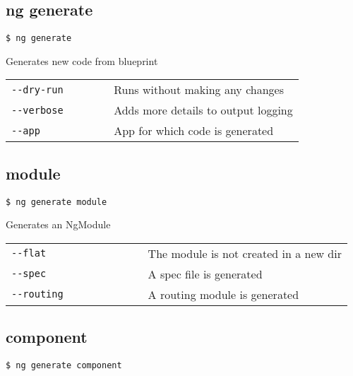 \documentclass[8pt]{extarticle} %
\begin{document}
\begin{multicols*}{3}

\section*{ng generate}

  \vspace{1ex}
  {\tt \$ ng generate  \itt{[options...]}}

  \vspace{0.6ex}

  {\small Generates new code from blueprint}

  \begin{tabular}{L{0.35\linewidth} L{0.65\linewidth}}
    \tt -{}-dry-run & \small Runs without making any changes \\
    \tt -{}-verbose & \small Adds more details to output logging \\
    \tt -{}-app & \small App for which code is generated
  \end{tabular}

  \subsection*{module}

    \vspace{1ex}
    {\tt \$ ng generate module  \itt{[options...]}}
    \vspace{0.6ex}

    {\small Generates an NgModule}
    \vspace{0.6ex}

    \begin{tabular}{L{0.40\linewidth} L{0.60\linewidth}}
      \tt -{}-flat & \small The module is not created in a new dir \\
      \tt -{}-spec & \small A spec file is generated \\
      \tt -{}-routing & \small A routing module is generated
    \end{tabular}

  \subsection*{component}

    \vspace{1ex}
    {\tt \$ ng generate component  \itt{[options...]}}
    \vspace{0.6ex}


\end{multicols*}
\end{document}
